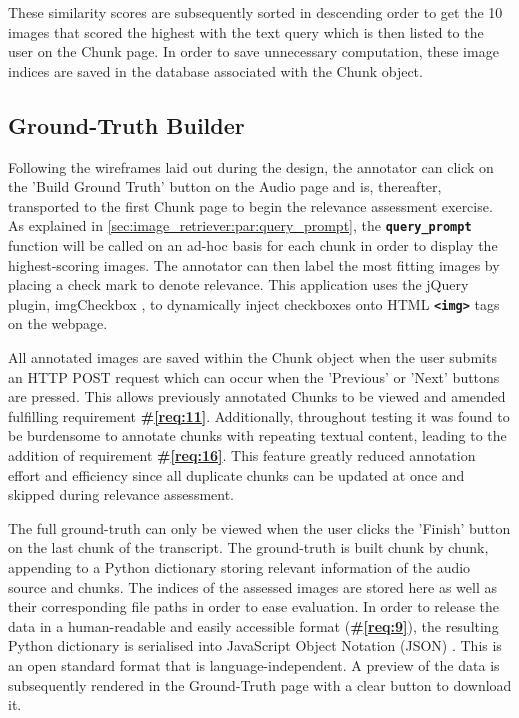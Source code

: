 \documentclass{l4proj}
\begin{document}
These similarity scores are subsequently sorted in descending order to get the 10 images that scored the highest with the text query which is then listed to the user on the Chunk page. In order to save unnecessary computation, these image indices are saved in the database associated with the Chunk object.


\subsection{Ground-Truth Builder}
Following the wireframes laid out during the design, the annotator can click on the 'Build Ground Truth' button on the Audio page and is, thereafter, transported to the first Chunk page to begin the relevance assessment exercise. As explained in \ref{sec:image_retriever:par:query_prompt}, the \textbf{\lstinline|query_prompt|} function will be called on an ad-hoc basis for each chunk in order to display the highest-scoring images. The annotator can then label the most fitting images by placing a check mark to denote relevance. This application uses the jQuery plugin, imgCheckbox \citep{imgcheckbox}, to dynamically inject checkboxes onto HTML \textbf{\lstinline|<img>|} tags on the webpage. 

All annotated images are saved within the Chunk object when the user submits an HTTP POST request which can occur when the 'Previous' or 'Next' buttons are pressed. This allows previously annotated Chunks to be viewed and amended fulfilling requirement \textbf{\#\ref{req:11}}. Additionally, throughout testing it was found to be burdensome to annotate chunks with repeating textual content, leading to the addition of requirement \textbf{\#\ref{req:16}}. This feature greatly reduced annotation effort and efficiency since all duplicate chunks can be updated at once and skipped during relevance assessment.

The full ground-truth can only be viewed when the user clicks the 'Finish' button on the last chunk of the transcript. The ground-truth is built chunk by chunk, appending to a Python dictionary storing relevant information of the audio source and chunks. The indices of the assessed images are stored here as well as their corresponding file paths in order to ease evaluation. In order to release the data in a human-readable and easily accessible format (\textbf{\#\ref{req:9}}), the resulting Python dictionary is serialised into JavaScript Object Notation (JSON) \citep{json}. This is an open standard format that is language-independent. A preview of the data is subsequently rendered in the Ground-Truth page with a clear button to download it.
\end{document}
